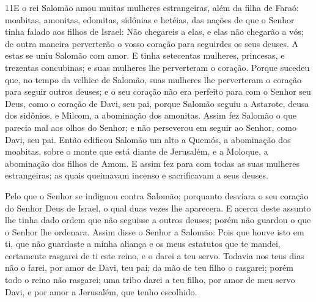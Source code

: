 \medskip

\lettrine{11} E o rei Salomão amou muitas mulheres
estrangeiras, além da filha de Faraó: moabitas, amonitas, edomitas,
sidônias e hetéias, das nações de que o Senhor tinha falado aos
filhos de Israel: Não chegareis a elas, e elas não chegarão a vós;
de outra maneira perverterão o vosso coração para seguirdes os seus
deuses. A estas se uniu Salomão com amor. E tinha setecentas
mulheres, princesas, e trezentas concubinas; e suas mulheres lhe
perverteram o coração. Porque sucedeu que, no tempo da velhice
de Salomão, suas mulheres lhe perverteram o coração para seguir
outros deuses; e o seu coração não era perfeito para com o Senhor
seu Deus, como o coração de Davi, seu pai, porque Salomão seguiu
a Astarote, deusa dos sidônios, e Milcom, a abominação dos amonitas.
Assim fez Salomão o que parecia mal aos olhos do Senhor; e não
perseverou em seguir ao Senhor, como Davi, seu pai. Então
edificou Salomão um alto a Quemós, a abominação dos moabitas, sobre
o monte que está diante de Jerusalém, e a Moloque, a abominação dos
filhos de Amom. E assim fez para com todas as suas mulheres
estrangeiras; as quais queimavam incenso e sacrificavam a seus
deuses.

Pelo que o Senhor se indignou contra Salomão; porquanto desviara o
seu coração do Senhor Deus de Israel, o qual duas vezes lhe
aparecera. E acerca deste assunto lhe tinha dado ordem que
não seguisse a outros deuses; porém não guardou o que o Senhor lhe
ordenara. Assim disse o Senhor a Salomão: Pois que houve isto
em ti, que não guardaste a minha aliança e os meus estatutos que te
mandei, certamente rasgarei de ti este reino, e o darei a teu servo.
Todavia nos teus dias não o farei, por amor de Davi, teu pai;
da mão de teu filho o rasgarei; porém todo o reino não
rasgarei; uma tribo darei a teu filho, por amor de meu servo Davi, e
por amor a Jerusalém, que tenho escolhido.

